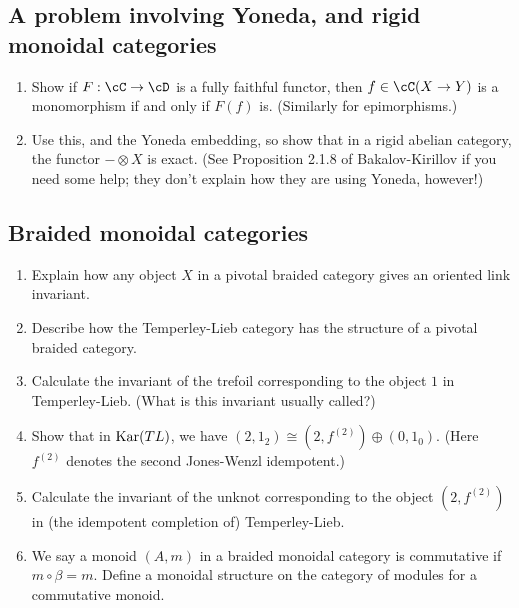 \documentclass[12pt]{amsart}
\begin{document}
\subsection{A problem involving Yoneda, and rigid monoidal categories}
\begin{enumerate}
\item Show if $F:\cC\to\cD$ is a fully faithful functor, then $f \in \cC(X \to Y)$ is a monomorphism if and only if $F(f)$ is. (Similarly for epimorphisms.)
\item Use this, and the Yoneda embedding, so show that in a rigid abelian category, the functor $- \otimes X$ is exact. (See Proposition 2.1.8 of Bakalov-Kirillov if you need some help; they don't explain how they are using Yoneda, however!)
\end{enumerate}

\subsection{Braided monoidal categories}
\begin{enumerate}
\item Explain how any object $X$ in a pivotal braided category gives an oriented link invariant.
\item Describe how the Temperley-Lieb category has the structure of a pivotal braided category.
\item Calculate the invariant of the trefoil corresponding to the object $1$ in Temperley-Lieb. (What is this invariant usually called?)
\item Show that in $\operatorname{Kar}(TL)$, we have $(2,1_2) \cong (2,f^{(2)}) \oplus (0, 1_0)$. (Here $f^{(2)}$ denotes the second Jones-Wenzl idempotent.)
\item Calculate the invariant of the unknot corresponding to the object $(2,f^{(2)})$ in (the idempotent completion of) Temperley-Lieb.
\item We say a monoid $(A, m)$ in a braided monoidal category is commutative if $m \circ \beta = m$. Define a monoidal structure on the category of modules for a commutative monoid.
\end{enumerate}
\end{document}
